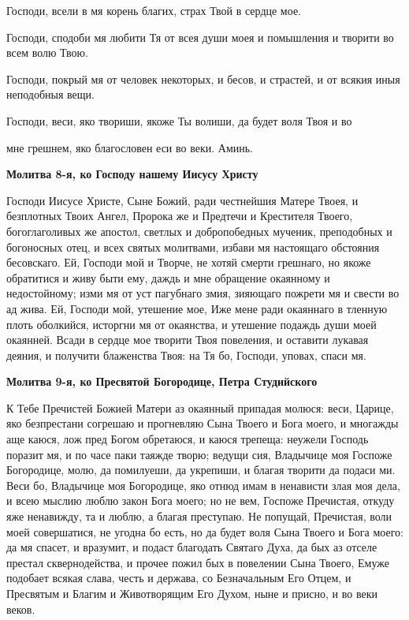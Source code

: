    Господи, всели в мя корень благих, страх Твой в сердце мое.



   Господи, сподоби мя любити Тя от всея души моея и помышления и
творити во всем волю Твою.



   Господи, покрый мя от человек некоторых, и бесов, и страстей, и от
всякия иныя неподобныя вещи.



   Господи, веси, яко твориши, якоже Ты волиши, да будет воля Твоя и во

мне грешнем, яко благословен еси во веки. Аминь.



 

\bfseries Молитва 8-я, ко Господу нашему Иисусу Христу\normalfont{}


   Господи Иисусе Христе, Сыне Божий, ради честнейшия Матере Твоея,
и безплотных Твоих Ангел, Пророка же и Предтечи и Крестителя
Твоего, богоглаголивых же апостол, светлых и добропобедных мученик,
преподобных и богоносных отец, и всех святых молитвами, избави мя
настоящаго обстояния бесовскаго. Ей, Господи мой и Творче, не хотяй
смерти грешнаго, но якоже обратитися и живу быти ему, даждь и мне
обращение окаянному и недостойному; изми мя от уст пагубнаго
змия, зияющаго пожрети мя и свести во ад жива. Ей, Господи мой,
утешение мое, Иже мене ради окаяннаго в тленную плоть оболкийся,
исторгни мя от окаянства, и утешение подаждь души моей окаянней.
Всади в сердце мое творити Твоя повеления, и оставити лукавая
деяния, и получити блаженства Твоя: на Тя бо, Господи, уповах, спаси
мя.



 

\bfseries Молитва 9-я, ко Пресвятой Богородице, Петра Студийского\normalfont{}


   К Тебе Пречистей Божией Матери аз окаянный припадая молюся: веси,
Царице, яко безпрестани согрешаю и прогневляю Сына Твоего и Бога
моего, и многажды аще каюся, лож пред Богом обретаюся, и каюся
трепеща: неужели Господь поразит мя, и по часе паки таяжде творю;
ведущи сия, Владычице моя Госпоже Богородице, молю, да помилуеши,
да укрепиши, и благая творити да подаси ми. Веси бо, Владычице
моя Богородице, яко отнюд имам в ненависти злая моя дела, и всею
мыслию люблю закон Бога моего; но не вем, Госпоже Пречистая,
откуду яже ненавижду, та и люблю, а благая преступаю. Не попущай,
Пречистая, воли моей совершатися, не угодна бо есть, но да будет
воля Сына Твоего и Бога моего: да мя спасет, и вразумит, и подаст
благодать Святаго Духа, да бых аз отселе престал сквернодейства, и
прочее пожил бых в повелении Сына Твоего, Емуже подобает всякая
слава, честь и держава, со Безначальным Его Отцем, и Пресвятым и
Благим и Животворящим Его Духом, ныне и присно, и во веки веков.

